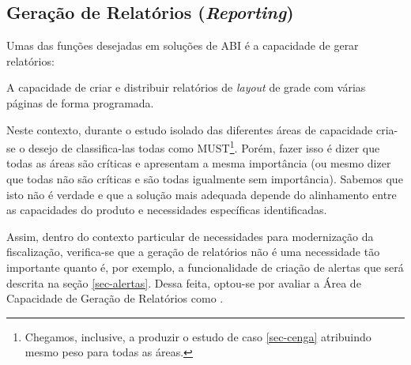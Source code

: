 \subsection{Geração de Relatórios (\emph{Reporting})}
\label{sub-reporting}

Umas das funções desejadas em soluções de ABI é a capacidade de gerar relatórios:

\begin{definition}
A capacidade de criar e distribuir relatórios de \emph{layout} de grade com várias páginas de forma programada.
\end{definition}

Neste contexto, durante o estudo isolado das diferentes áreas de capacidade cria-se o desejo de classifica-las todas como MUST\footnote{Chegamos, inclusive, a produzir o estudo de caso \ref{sec-cenga} atribuindo mesmo peso para todas as áreas.}. Porém, fazer isso é dizer que todas as áreas são críticas e apresentam a mesma importância (ou mesmo dizer que todas não são críticas e são todas igualmente sem importância). Sabemos que isto não é verdade e que a solução mais adequada depende do alinhamento entre as capacidades do produto e necessidades específicas identificadas. 

Assim, dentro do contexto particular de necessidades para modernização da fiscalização, verifica-se que a geração de relatórios não é uma necessidade tão importante quanto é, por exemplo, a funcionalidade de criação de alertas que será descrita na seção \ref{sec-alertas}. Dessa feita, optou-se por avaliar a Área de Capacidade de Geração de Relatórios como \COULD.